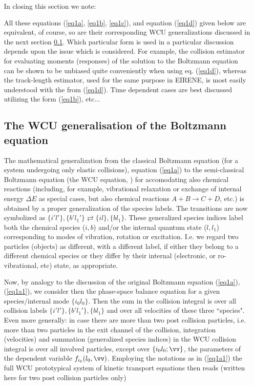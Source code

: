 In closing this section we note:


All these equations (\ref{eq1a}, \ref{eq1b}, \ref{eq1c}), and equation (\ref{eq1d})
given below are equivalent, of course,
so are their corresponding WCU generalizations discussed in the next section \ref{sec1.01}.
Which particular
form is used in a particular discussion depends upon the issue which is
considered. For example, the collision estimator for evaluating moments (responses) of the solution to the Boltzmann equation can be shown to be
unbiased quite conveniently when using eq. (\ref{eq1d}), whereas the track-length
estimator, used for the same purpose in EIRENE, is most easily understood with the from (\ref{eq1d}). Time dependent
cases are best discussed utilizing the form (\ref{eq1b}), etc...

\subsection{The WCU generalisation of the Boltzmann equation} \label{sec1.01}

The mathematical generalization from the classical Boltzmann equation
(for a system undergoing only elastic collisions),
equation (\ref{eq1a})
to the semi-classical Boltzmann
equation (the WCU equation, \cite{kn:WCU}) for accomodating also chemical reactions (including, for example,
vibrational relaxation or exchange of internal energy $\Delta E$ as special
cases, but also chemical reactions $A+B \rightarrow C+D$, etc.)
is obtained by a proper generalization of the species labels.
The transitions are now symbolized as $\{i'l'\},\{b'l_1'\} \rightleftarrows \{il\},\{bl_1\}$. These
generalized species indices label both the chemical species ($i,b$) and/or the
internal quantum state ($l,l_1$) corresponding to modes of vibration, rotation or excitation.
I.e. we regard two particles (objects) as different, with a different label,
if either they belong to a different
chemical species or they differ by their internal (electronic, or ro-vibrational, etc) state,
as appropriate.


Now, by analogy to the discussion of the original Boltzmann equation (\ref{eq1a}), (\ref{eq1a1}),
we consider then the phase-space balance equation for a given species/internal mode $\{i_0l_0\}$. Then the sum in the collision
integral is over all collision labels $\{i'l'\}, \{b'l_1'\}, \{bl_{1}\}$ and over all velocities of these three ``species".
Even more generally:
in case there are more than two post collision particles, i.e. more than two particles in the exit channel of the collision, integration (velocities) and summation (generalized species indices) in the WCU collision integral is over all involved particles, except over $\{i_0l_0; \vv\}$, the parameters of the dependent variable $f_{i_0}(l_0,\vv)$. Employing the notations as in (\ref{eq1a1}) the full WCU prototypical system of kinetic transport equations then reads (written here for two post collision particles only)

